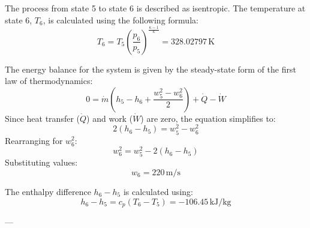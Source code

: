The process from state 5 to state 6 is described as isentropic. The temperature at state 6, \( T_6 \), is calculated using the following formula:  
\[
T_6 = T_5 \left( \frac{p_6}{p_5} \right)^{\frac{\kappa - 1}{\kappa}} = 328.02797 \, \text{K}
\]

The energy balance for the system is given by the steady-state form of the first law of thermodynamics:  
\[
0 = \dot{m} \left( h_5 - h_6 + \frac{w_5^2 - w_6^2}{2} \right) + \dot{Q} - \dot{W}
\]  
Since heat transfer (\( \dot{Q} \)) and work (\( \dot{W} \)) are zero, the equation simplifies to:  
\[
2(h_6 - h_5) = w_5^2 - w_6^2
\]  
Rearranging for \( w_6^2 \):  
\[
w_6^2 = w_5^2 - 2(h_6 - h_5)
\]  
Substituting values:  
\[
w_6 = 220 \, \text{m/s}
\]

The enthalpy difference \( h_6 - h_5 \) is calculated using:  
\[
h_6 - h_5 = c_p (T_6 - T_5) = -106.45 \, \text{kJ/kg}
\]

---